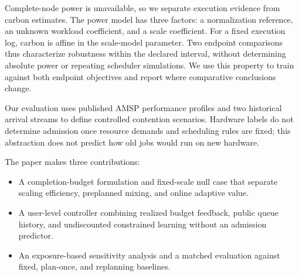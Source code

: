 Complete-node power is unavailable, so we separate execution evidence from
carbon estimates. The power model has three factors: a normalization
reference, an unknown workload coefficient, and a scale coefficient. For a fixed
execution log, carbon is affine in the scale-model parameter. Two endpoint
comparisons thus characterize robustness within the declared interval,
without determining absolute power or repeating scheduler simulations.
We use this property to train against both endpoint objectives and report
where comparative conclusions change.

Our evaluation uses published AMSP performance profiles and two historical
arrival streams to define controlled contention scenarios. Hardware labels do
not determine admission once resource demands and scheduling rules are fixed;
this abstraction does not predict how old jobs would run on new hardware.

The paper makes three contributions:
\begin{itemize}
\item A completion-budget formulation and fixed-scale null case that separate
scaling efficiency, preplanned mixing, and online adaptive value.
\item A user-level controller combining realized budget feedback, public queue
history, and undiscounted constrained learning without an admission predictor.
\item An exposure-based sensitivity analysis and a matched evaluation against
fixed, plan-once, and replanning baselines.
\end{itemize}
